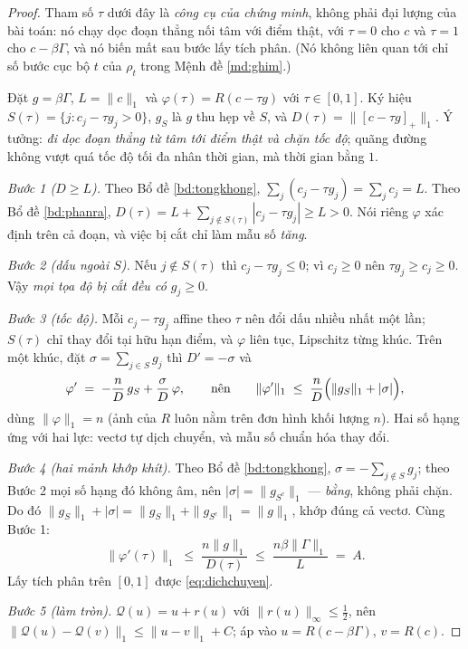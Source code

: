 \documentclass[11pt,a4paper]{article}
\theoremstyle{remark}
\newcommand{\pos}[1]{\left[#1\right]_+}
\newcommand{\quant}{\mathcal{Q}}
\begin{document}
\begin{proof}
Tham số $\tau$ dưới đây là \emph{công cụ của chứng minh}, không phải đại
lượng của bài toán: nó chạy dọc đoạn thẳng nối tâm với điểm thật, với
$\tau=0$ cho $c$ và $\tau=1$ cho $c-\beta\Gamma$, và nó biến mất sau bước lấy
tích phân. (Nó không liên quan tới chỉ số bước cục bộ $t$ của $\rho_t$ trong
Mệnh đề \ref{md:ghim}.)

Đặt $g=\beta\Gamma$, $L=\|c\|_1$ và $\varphi(\tau)=R(c-\tau g)$ với
$\tau\in[0,1]$.
Ký hiệu $S(\tau)=\{j:c_j-\tau g_j>0\}$, $g_S$ là $g$ thu hẹp về $S$, và
$D(\tau)=\|\pos{c-\tau g}\|_1$. Ý tưởng: \emph{đi dọc đoạn thẳng từ tâm tới điểm
thật và chặn tốc độ}; quãng đường không vượt quá tốc độ tối đa nhân thời
gian, mà thời gian bằng $1$.

\emph{Bước 1 ($D\ge L$).} Theo Bổ đề \ref{bd:tongkhong},
$\sum_j(c_j-\tau g_j)=\sum_j c_j=L$. Theo Bổ đề \ref{bd:phanra},
$D(\tau)=L+\sum_{j\notin S(\tau)}|c_j-\tau g_j|\ge L>0$. Nói riêng $\varphi$ xác định
trên cả đoạn, và việc bị cắt chỉ làm mẫu số \emph{tăng}.

\emph{Bước 2 (dấu ngoài $S$).} Nếu $j\notin S(\tau)$ thì $c_j-\tau g_j\le0$; vì
$c_j\ge0$ nên $\tau g_j\ge c_j\ge0$. Vậy \emph{mọi tọa độ bị cắt đều có
$g_j\ge0$}.

\emph{Bước 3 (tốc độ).} Mỗi $c_j-\tau g_j$ affine theo $\tau$ nên đổi dấu nhiều nhất
một lần; $S(\tau)$ chỉ thay đổi tại hữu hạn điểm, và $\varphi$ liên tục,
Lipschitz từng khúc. Trên một khúc, đặt $\sigma=\sum_{j\in S}g_j$ thì
$D'=-\sigma$ và
\[
\varphi'\;=\;-\frac{n}{D}\,g_S+\frac{\sigma}{D}\,\varphi,
\qquad\text{nên}\qquad
\|\varphi'\|_1\;\le\;\frac{n}{D}\Bigl(\|g_S\|_1+|\sigma|\Bigr),
\]
dùng $\|\varphi\|_1=n$ (ảnh của $R$ luôn nằm trên đơn hình khối lượng $n$).
Hai số hạng ứng với hai lực: vectơ tự dịch chuyển, và mẫu số chuẩn hóa thay
đổi.

\emph{Bước 4 (hai mảnh khớp khít).} Theo Bổ đề \ref{bd:tongkhong},
$\sigma=-\sum_{j\notin S}g_j$; theo Bước 2 mọi số hạng đó không âm, nên
$|\sigma|=\|g_{S^c}\|_1$ --- \emph{bằng}, không phải chặn. Do đó
$\|g_S\|_1+|\sigma|=\|g_S\|_1+\|g_{S^c}\|_1=\|g\|_1$, khớp đúng cả vectơ.
Cùng Bước 1:
\[
\|\varphi'(\tau)\|_1\;\le\;\frac{n\|g\|_1}{D(\tau)}\;\le\;\frac{n\beta\|\Gamma\|_1}{L}\;=\;A .
\]
Lấy tích phân trên $[0,1]$ được \eqref{eq:dichchuyen}.

\emph{Bước 5 (làm tròn).} $\quant(u)=u+r(u)$ với $\|r(u)\|_\infty\le\tfrac12$,
nên $\|\quant(u)-\quant(v)\|_1\le\|u-v\|_1+C$; áp vào $u=R(c-\beta\Gamma)$,
$v=R(c)$.
\end{proof}
\end{document}
